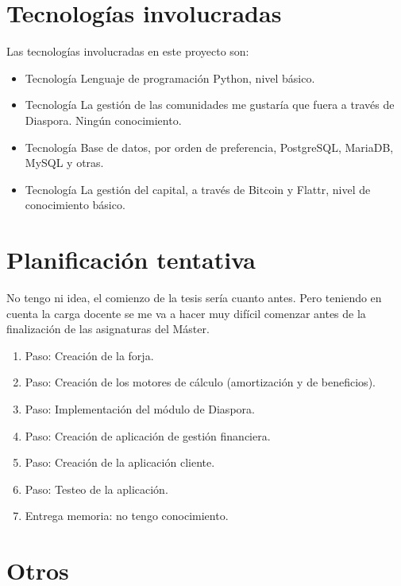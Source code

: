 \documentclass[10pt]{article}
\begin{document}
\section{Tecnologías involucradas}

Las tecnologías involucradas en este proyecto son:

\begin{itemize}
  \item Tecnología Lenguaje de programación Python, nivel básico.
  \item Tecnología La gestión de las comunidades me gustaría que fuera a través de Diaspora. Ningún conocimiento.
  \item Tecnología Base de datos, por orden de preferencia, PostgreSQL, MariaDB, MySQL y otras.
  \item Tecnología La gestión del capital, a través de Bitcoin y Flattr, nivel de conocimiento básico.
\end{itemize}


\section{Planificación tentativa}

No tengo ni idea, el comienzo de la tesis sería cuanto antes. Pero teniendo en cuenta la carga docente se me va a hacer muy difícil comenzar antes de la finalización de las asignaturas del Máster.

\begin{enumerate}
  \item Paso: Creación de la forja.
  \item Paso: Creación de los motores de cálculo (amortización y de beneficios).
  \item Paso: Implementación del módulo de Diaspora.
  \item Paso: Creación de aplicación de gestión financiera. 
  \item Paso: Creación de la aplicación cliente.
  \item Paso: Testeo de la aplicación.
  \item Entrega memoria: no tengo conocimiento.
\end{enumerate}

\section{Otros}

\end{document}

